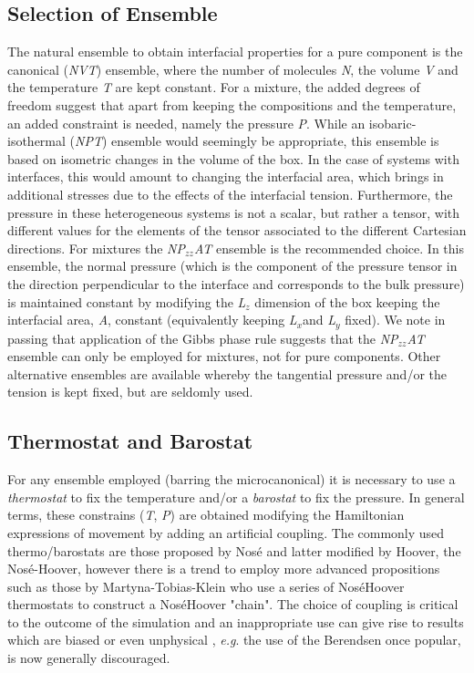 \documentclass[9pt,bestpractices]{livecoms}
\begin{document}
\subsection{Selection of Ensemble}
\label{sec:ensemble}
The natural ensemble to obtain interfacial properties for a pure component is
the canonical (\textit{NVT}) ensemble, where the number of molecules
\textit{N}, the volume \textit{V} and the temperature \textit{T} are kept
constant\textit{.} For a mixture, the added degrees of freedom suggest that
apart from keeping the compositions and the temperature, an added constraint is
needed, namely the pressure \textit{P}. While an isobaric-isothermal
(\textit{NPT}) ensemble would seemingly be appropriate, this ensemble is based
on isometric changes in the volume of the box. In the case of systems with
interfaces, this would amount to changing the interfacial area, which brings in
additional stresses due to the effects of the interfacial tension. Furthermore,
the pressure in these heterogeneous systems is not a scalar, but rather
a tensor, with different values for the elements of the tensor associated to
the different Cartesian directions.  For mixtures the
\textit{NP}$_{zz}$\textit{AT} ensemble is the recommended choice. In this
ensemble, the normal pressure (which is the component of the pressure tensor in
the direction perpendicular to the interface and corresponds to the bulk
pressure) is maintained constant by modifying the \textit{L}$_{z}$ dimension of
the box keeping the interfacial area, \textit{A}, constant (equivalently
keeping \textit{L}$_{x }$and \textit{L}$_{y}$ fixed). We note in passing that
application of the Gibbs phase rule suggests that the
\textit{NP}$_{zz}$\textit{AT} ensemble can only be employed for mixtures, not
for pure components. Other alternative ensembles are available
\citep{zhang1995} whereby the tangential pressure and/or the tension
is kept fixed, but are seldomly used.  

\subsection{Thermostat and Barostat}
\label{sec:thermostat}
For any ensemble employed (barring the microcanonical) it is necessary to use
a \textit{thermostat} to fix the temperature and/or a \textit{barostat} to fix
the pressure. In general terms, these constrains (\textit{T}, \textit{P}) are
obtained modifying the Hamiltonian expressions of movement by adding an
artificial coupling. The commonly used thermo/barostats are those proposed by
Nos\'{e} and latter modified by Hoover, the Nos\'{e}-Hoover\citep{hoover1985},
however there is a trend to employ more advanced propositions such as
those by Martyna-Tobias-Klein \citep{martyna1992} who use a series of
Nos\'{e}\textendash{}Hoover thermostats to construct
a Nos\'{e}\textendash{}Hoover "chain".  The choice of coupling is critical to
the outcome of the simulation \citep{shirts2013}
and an inappropriate use can give rise to results which are biased
or even unphysical \citep{wong2016}, \textit{e.g}. the use of
the Berendsen \citep{berendsen1984}
once popular, is now generally discouraged.
\end{document}
